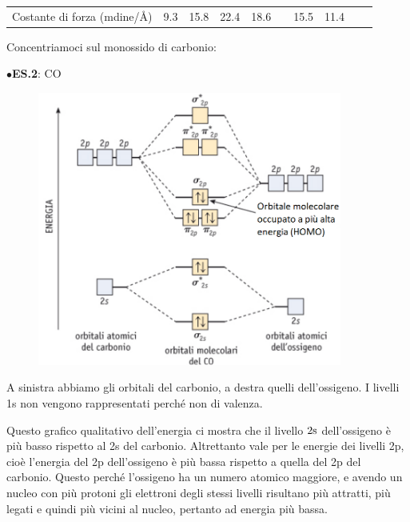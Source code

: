 \begin{center}
\begin{tabular}{m{3.4cm}m{1cm}m{1cm}m{1cm}m{1cm}|m{1cm}m{1cm}m{1cm}m{1cm}m{1cm}}
        \vspace{0.2cm}Costante di forza (mdine/Å) & \vspace{0.2cm}9.3 & \vspace{0.2cm}15.8 & \vspace{0.2cm}22.4 & \vspace{0.2cm}18.6 & & \vspace{0.2cm}15.5 & \vspace{0.2cm}11.4
    \end{tabular}
\end{center}

Concentriamoci sul monossido di carbonio:

\vspace{0.2cm}$\bullet$\textbf{ES.2}: CO

\begin{figure}[htp]
    \centering
    \includegraphics[width=10cm]{immagini/orbitali_molecolari_CO.png}
\end{figure}

A sinistra abbiamo gli orbitali del carbonio, a destra quelli dell'ossigeno. I livelli 1s non vengono rappresentati perché non di valenza.

Questo grafico qualitativo dell'energia ci mostra che il livello $\rm 2s$ dell'ossigeno è più basso rispetto al 2s del carbonio. Altrettanto vale per le energie dei livelli 2p, cioè l'energia del 2p dell'ossigeno è più bassa rispetto a quella del 2p del carbonio. Questo perché l'ossigeno ha un numero atomico maggiore, e avendo un nucleo con più protoni gli elettroni degli stessi livelli risultano più attratti, più legati e quindi più vicini al nucleo, pertanto ad energia più bassa.

